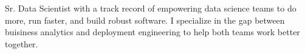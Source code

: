 
\begin{cvparagraph}

  Sr. Data Scientist with a track record of empowering data science teams to do
  more, run faster, and build robust software. I specialize in the gap between
  buisiness analytics and deployment engineering to help both teams work better
  together.
\end{cvparagraph}
